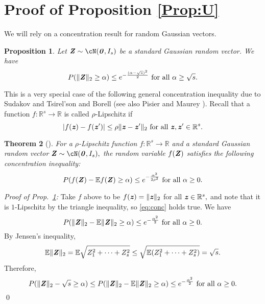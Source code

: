 \documentclass[11pt,onecolumn]{IEEEtran}
\newtheorem{theorem}{Theorem}[section]
\newtheorem{proposition}[theorem]{Proposition}
\def\mathbi#1{{\textbf{\textit #1}}}
\begin{document}
\section{Proof of Proposition \ref{Prop:U}}\label{ap:concen}
We will rely on a concentration result for random Gaussian vectors.
\begin{proposition}\label{Prop:Z}
Let $\mathbi{Z}\sim \cN(\mathbi{0}, I_s)$ be a standard Gaussian random vector. We have
\begin{equation}\label{eq:Z2}
P(\|\mathbi{Z}\|_2 \ge \alpha) \le e^{-\frac{(\alpha-\sqrt{s})^2}{2}} \text{~for all~} \alpha \ge \sqrt{s}.
\end{equation}
\end{proposition}
This is a very special case of the following general concentration inequality due to Sudakov and Tsirel'son \cite{Sudakov78} and Borell \cite{Borell75} (see also Pisier and Maurey \cite[page 176]{Pisier86}).
Recall that a function $f:\mathbb{R}^s \to \mathbb{R}$ is called $\rho$-Lipschitz if
$$
|f(\mathbi{z})-f(\mathbi{z}')| \le \rho \| \mathbi{z} - \mathbi{z}' \|_2 
\text{~for all~} \mathbi{z},\mathbi{z}'\in\mathbb{R}^s.
$$
\begin{theorem}[\cite{Sudakov78,Borell75}]
For a $\rho$-Lipschitz function $f:\mathbb{R}^s \to \mathbb{R}$
and a standard Gaussian random vector $\mathbi{Z} \sim \cN(\mathbi{0}, I_s),$ the random variable $f(\mathbi{Z})$ satisfies the following concentration inequality:
\begin{equation}\label{eq:conc}
P(f(\mathbi{Z})-\mathbb{E} f(\mathbi{Z}) \ge \alpha) \le e^{-\frac{\alpha^2}{2\rho^2}} \text{~for all~} \alpha \ge 0.
\end{equation}
\end{theorem}
{\em Proof of Prop.~\ref {Prop:Z}:} 
Take $f$ above to be $f(\mathbi{z})=\|\mathbi{z}\|_2$ for all $\mathbi{z}\in \mathbb{R}^s,$ 
and note that it is $1$-Lipschitz by the triangle inequality, so \eqref{eq:conc} holds true. We have
$$
P(\|\mathbi{Z}\|_2-\mathbb{E} \|\mathbi{Z}\|_2 \ge \alpha) \le e^{-\frac{\alpha^2}{2}} \text{~for all~} \alpha \ge 0.
$$
By Jensen's inequality,
$$
\mathbb{E} \|\mathbi{Z}\|_2 = \mathbb{E} \sqrt{Z_1^2+\dots+Z_s^2} \le \sqrt {\mathbb{E} (Z_1^2+\dots+Z_s^2)} =\sqrt{s}.
$$
Therefore,
$$
P(\|\mathbi{Z}\|_2- \sqrt{s} \ge \alpha) \le
P(\|\mathbi{Z}\|_2-\mathbb{E} \|\mathbi{Z}\|_2 \ge \alpha) \le e^{-\frac{\alpha^2}{2}} \text{~for all~} \alpha \ge 0.
$$
\qed

\end{document}
